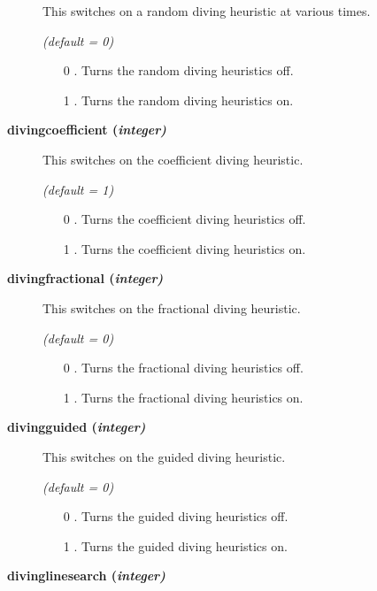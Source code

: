 \begin{description}
This switches on a random diving heuristic at various times.

\textsl{(default = 0)}
\begin{itemize}
\item[0] .
Turns the random diving heuristics off.
\item[1] .
Turns the random diving heuristics on.
\end{itemize}

\item[\label{divingcoefficient}\hypertarget{divingcoefficient}
{\textbf{divingcoefficient (\slshape{integer})}}]\hspace{1.0in}

This switches on the coefficient diving heuristic.

\textsl{(default = 1)}
\begin{itemize}
\item[0] .
Turns the coefficient diving heuristics off.
\item[1] .
Turns the coefficient diving heuristics on.
\end{itemize}

\item[\label{divingfractional}\hypertarget{divingfractional}
{\textbf{divingfractional (\slshape{integer})}}]\hspace{1.0in}

This switches on the fractional diving heuristic.

\textsl{(default = 0)}
\begin{itemize}
\item[0] .
Turns the fractional diving heuristics off.
\item[1] .
Turns the fractional diving heuristics on.
\end{itemize}

\item[\label{divingguided}\hypertarget{divingguided}
{\textbf{divingguided (\slshape{integer})}}]\hspace{1.0in}

This switches on the guided diving heuristic.

\textsl{(default = 0)}
\begin{itemize}
\item[0] .
Turns the guided diving heuristics off.
\item[1] .
Turns the guided diving heuristics on.
\end{itemize}

\item[\label{divinglinesearch}\hypertarget{divinglinesearch}
{\textbf{divinglinesearch (\slshape{integer})}}]\hspace{1.0in}


\end{description}

